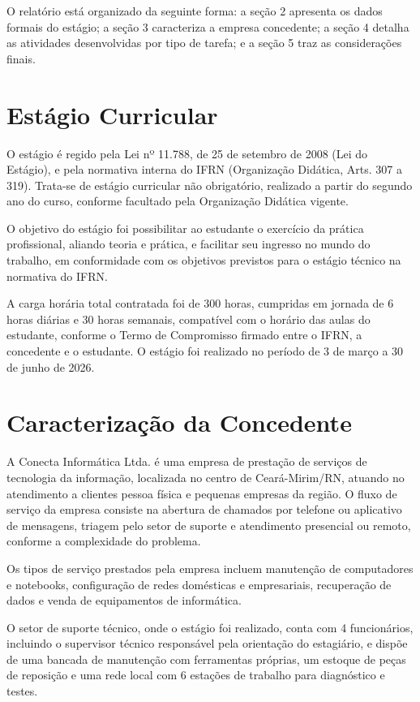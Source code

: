 \documentclass[article,12pt,a4paper]{abntex2}
\begin{document}
O relatório está organizado da seguinte forma: a seção 2 apresenta os
dados formais do estágio; a seção 3 caracteriza a empresa concedente; a
seção 4 detalha as atividades desenvolvidas por tipo de tarefa; e a seção
5 traz as considerações finais.

\section{Estágio Curricular}

O estágio é regido pela Lei nº 11.788, de 25 de setembro de 2008 (Lei do
Estágio), e pela normativa interna do IFRN (Organização Didática, Arts.
307 a 319). Trata-se de estágio curricular não obrigatório, realizado a
partir do segundo ano do curso, conforme facultado pela Organização
Didática vigente.

O objetivo do estágio foi possibilitar ao estudante o exercício da prática
profissional, aliando teoria e prática, e facilitar seu ingresso no mundo
do trabalho, em conformidade com os objetivos previstos para o estágio
técnico na normativa do IFRN.

A carga horária total contratada foi de 300 horas, cumpridas em jornada de
6 horas diárias e 30 horas semanais, compatível com o horário das aulas do
estudante, conforme o Termo de Compromisso firmado entre o IFRN, a
concedente e o estudante. O estágio foi realizado no período de 3 de
março a 30 de junho de 2026.

\section{Caracterização da Concedente}

A Conecta Informática Ltda. é uma empresa de prestação de serviços de
tecnologia da informação, localizada no centro de Ceará-Mirim/RN, atuando
no atendimento a clientes pessoa física e pequenas empresas da região. O
fluxo de serviço da empresa consiste na abertura de chamados por telefone
ou aplicativo de mensagens, triagem pelo setor de suporte e atendimento
presencial ou remoto, conforme a complexidade do problema.

Os tipos de serviço prestados pela empresa incluem manutenção de
computadores e notebooks, configuração de redes domésticas e empresariais,
recuperação de dados e venda de equipamentos de informática.

O setor de suporte técnico, onde o estágio foi realizado, conta com 4
funcionários, incluindo o supervisor técnico responsável pela orientação
do estagiário, e dispõe de uma bancada de manutenção com ferramentas
próprias, um estoque de peças de reposição e uma rede local com 6
estações de trabalho para diagnóstico e testes.
\end{document}
